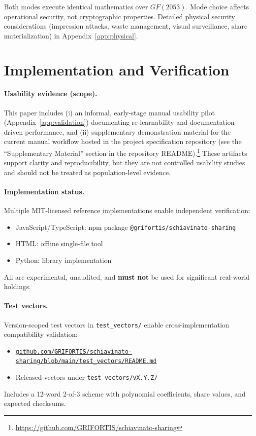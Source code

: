 \documentclass[11pt]{article}
\begin{document}
Both modes execute identical mathematics over $GF(2053)$. Mode choice affects operational security, not cryptographic properties. Detailed physical security considerations (impression attacks, waste management, visual surveillance, share materialization) in Appendix~\ref{app:physical}.

\section{Implementation and Verification}
\label{sec:implementation}

\paragraph{Usability evidence (scope).} This paper includes (i) an informal, early-stage manual usability pilot (Appendix~\ref{app:validation}) documenting re-learnability and documentation-driven performance, and (ii) supplementary demonstration material for the current manual workflow hosted in the project specification repository (see the ``Supplementary Material'' section in the repository README).\footnote{\url{https://github.com/GRIFORTIS/schiavinato-sharing}} These artifacts support clarity and reproducibility, but they are not controlled usability studies and should not be treated as population-level evidence.

\paragraph{Implementation status.} Multiple MIT-licensed reference implementations enable independent verification:
\begin{itemize}[noitemsep]
    \item JavaScript/TypeScript: npm package \texttt{@grifortis/\allowbreak schiavinato-sharing}
    \item HTML: offline single-file tool
    \item Python: library implementation
\end{itemize}
All are experimental, unaudited, and \textbf{must not} be used for significant real-world holdings.

\paragraph{Test vectors.} Version-scoped test vectors in \texttt{test\_vectors/} enable cross-implementation compatibility validation:
\begin{itemize}[noitemsep]
    \item \href{https://github.com/GRIFORTIS/schiavinato-sharing/blob/main/test_vectors/README.md}{\texttt{github.com/\allowbreak GRIFORTIS/\allowbreak schiavinato-sharing/\allowbreak blob/\allowbreak main/\allowbreak test\_vectors/\allowbreak README.md}}
    \item Released vectors under \texttt{test\_vectors/\allowbreak vX.Y.Z/}
\end{itemize}
Includes a 12-word 2-of-3 scheme with polynomial coefficients, share values, and expected checksums.
\end{document}
